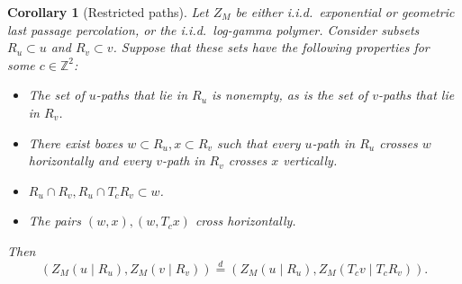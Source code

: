\documentclass[aop, preprint]{imsart}
\theoremstyle{plain}
\newtheorem{corollary}[theorem]{Corollary}
\theoremstyle{definition}
\theoremstyle{plain}
\newcommand{\sset}{\subset}
\newcommand{\Z}{\mathds{Z}}
\newcommand{\eqd}{\stackrel{d}{=}}
\begin{document}
\begin{corollary}[Restricted paths]
	\label{C:restricted-polymer}
	Let $Z_M$ be either i.i.d.\ exponential or geometric last passage percolation, or the i.i.d.\ log-gamma polymer. 
	Consider subsets $R_u \sset u$ and $R_v \sset v$. Suppose that these sets have the following properties for some $c \in \Z^2$:
	\begin{itemize}[nosep]
		\item The set of $u$-paths that lie in $R_u$ is nonempty, as is the set of $v$-paths that lie in $R_v$.
		\item There exist boxes $w \sset R_u, x \sset R_v$ such that every $u$-path in $R_u$ crosses $w$ horizontally and every $v$-path in $R_v$ crosses $x$ vertically.
		\item $R_u \cap R_v, R_u \cap T_c R_v \sset w$.
		\item The pairs $(w, x), (w, T_c x)$ cross horizontally.
	\end{itemize} Then
	$$
	(Z_M(u \;|\; R_u), Z_M(v \;|\; R_v)) \eqd (Z_M(u \;|\; R_u), Z_M(T_cv \;|\; T_c R_{v})).
	$$
\end{corollary}
\end{document}
